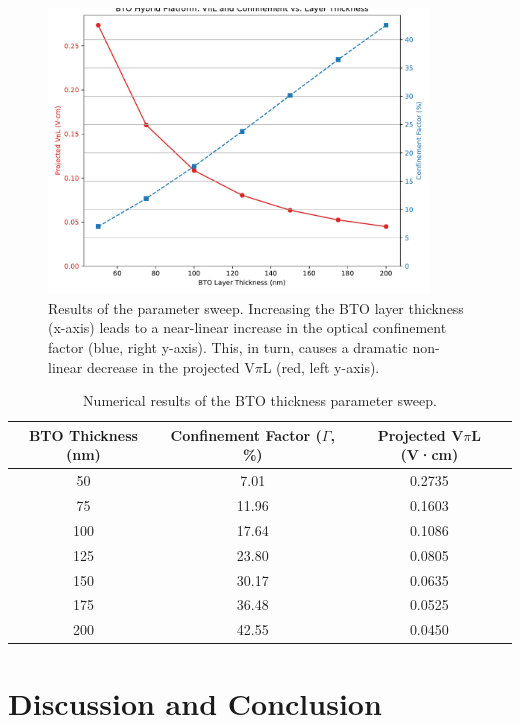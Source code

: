 \documentclass[12pt, a4paper, numbers]{report}
\begin{document}
\begin{figure}[htbp]
    \centering
    \includegraphics[width=0.9\textwidth]{simulation_v2_optimization_sweep.pdf}
    \caption{Results of the parameter sweep. Increasing the BTO layer thickness (x-axis) leads to a near-linear increase in the optical confinement factor (blue, right y-axis). This, in turn, causes a dramatic non-linear decrease in the projected V$\pi$L (red, left y-axis).}
    \label{fig:sweep}
\end{figure}

\begin{table}[htbp]
\caption{Numerical results of the BTO thickness parameter sweep.}
\label{tab:sweep}
\centering
\begin{tabular}{ccc}
\toprule
\textbf{BTO Thickness (nm)} & \textbf{Confinement Factor ($\Gamma$, \%)} & \textbf{Projected V$\pi$L (V·cm)} \\
\midrule
50   & 7.01   & 0.2735 \\
75   & 11.96  & 0.1603 \\
100  & 17.64  & 0.1086 \\
125  & 23.80  & 0.0805 \\
150  & 30.17  & 0.0635 \\
175  & 36.48  & 0.0525 \\
200  & 42.55  & 0.0450 \\
\bottomrule
\end{tabular}
\end{table}

\chapter{Discussion and Conclusion}
\end{document}
